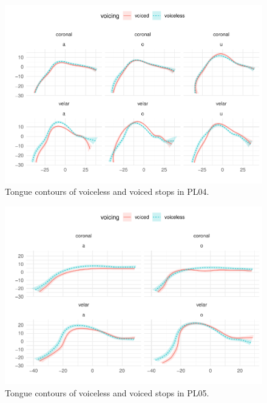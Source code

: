 \documentclass[11pt,]{article}
\begin{document}
\begin{figure}

{\centering \includegraphics[width=.8\textwidth]{2018-polar-gam_files/figure-latex/Figure14} 

}

\caption{Tongue contours of voiceless and voiced stops in PL04.}\label{f:Figure14}
\end{figure}

\begin{figure}

{\centering \includegraphics[width=.8\textwidth]{2018-polar-gam_files/figure-latex/Figure15} 

}

\caption{Tongue contours of voiceless and voiced stops in PL05.}\label{f:Figure15}
\end{figure}
\end{document}
